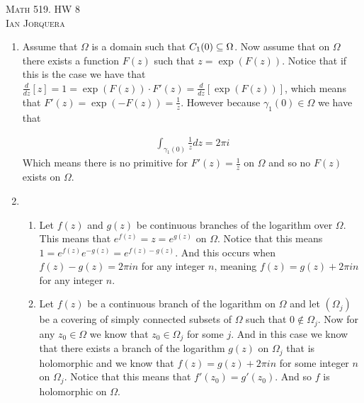 \documentclass[12pt]{amsart}
\begin{document}
\begin{center}
    \textsc{Math 519. HW 8\\ Ian Jorquera}
\end{center}
\vspace{1em}

\begin{enumerate}
\item Assume that $\Omega$ is a domain such that $C_1(0)\subseteq \Omega$. Now assume that on $\Omega$ there exists a function $F(z)$ such that $z=\exp(F(z))$. Notice that if this is the case we have that $\frac{d}{dz}\left[z\right]=1=\exp(F(z))\cdot F'(z)=\frac{d}{dz}\left[\exp(F(z))\right]$, which means that $F'(z)=\exp(-F(z))=\frac{1}{z}$. However because $\gamma_1(0)\in \Omega$ we have that

\begin{align*}
    \int_{\gamma_1(0)}\frac{1}{z}dz=2\pi i
\end{align*}
Which means there is no primitive for $F'(z)=\frac{1}{z}$ on $\Omega$ and so no $F(z)$ exists on $\Omega$.\\

\item
\begin{enumerate}
    \item Let $f(z)$ and $g(z)$ be continuous branches of the logarithm over $\Omega$. This means that $e^{f(z)}=z=e^{g(z)}$ on $\Omega$. Notice that this means $1=e^{f(z)}e^{-g(z)}=e^{f(z)-g(z)}$. And this occurs when $f(z)-g(z)=2\pi i n$ for any integer $n$, meaning $f(z)=g(z)+2\pi i n$ for any integer $n$.\\
    
    \item Let $f(z)$ be a continuous branch of the logarithm on $\Omega$ and let $(\Omega_j)$ be a covering of simply connected subsets of $\Omega$ such that $0\not\in \Omega_j$. Now for any $z_0\in \Omega$ we know that $z_0\in \Omega_j$ for some $j$. And in this case we know that there exists a branch of the logarithm $g(z)$ on $\Omega_j$ that is holomorphic and we know that $f(z)=g(z)+2\pi i n$ for some integer $n$ on $\Omega_j$. Notice that this means that $f'(z_0)=g'(z_0)$. And so $f$ is holomorphic on $\Omega$.\\
\end{enumerate}


\end{enumerate}
\end{document}
